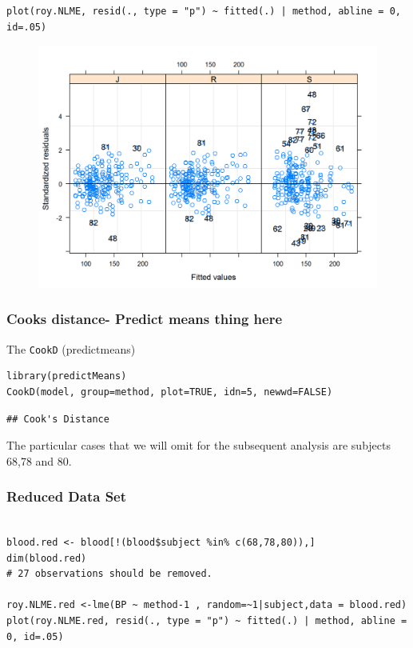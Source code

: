 \documentclass[Main.tex]{subfiles}
\begin{document}
\begin{verbatim}
plot(roy.NLME, resid(., type = "p") ~ fitted(.) | method, abline = 0, id=.05)
\end{verbatim}
\begin{figure}
\centering
\includegraphics[width=0.9\linewidth]{images/bloodnlmeResidPlot2}
\caption{}
\label{fig:blood}
\end{figure}


\subsubsection{Cooks distance- Predict means thing here}


The \texttt{CookD} (predictmeans)



\begin{framed}
\begin{verbatim}
library(predictMeans)
CookD(model, group=method, plot=TRUE, idn=5, newwd=FALSE)
\end{verbatim}
\end{framed}


\begin{verbatim}
## Cook's Distance

\end{verbatim}

The particular cases that we will omit for the subsequent analysis are subjects 68,78 and 80.

\subsubsection{Reduced Data Set}

\begin{framed}
\begin{verbatim}

blood.red <- blood[!(blood$subject %in% c(68,78,80)),]
dim(blood.red)
# 27 observations should be removed.

roy.NLME.red <-lme(BP ~ method-1 , random=~1|subject,data = blood.red)
plot(roy.NLME.red, resid(., type = "p") ~ fitted(.) | method, abline = 0, id=.05)
\end{verbatim}
\end{framed}
\end{document}

